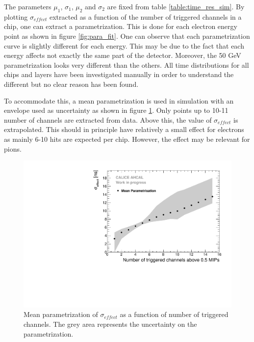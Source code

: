 The parameters $\mu_1$, $\sigma_1$, $\mu_2$ and $\sigma_2$ are fixed from table \ref{table:time_res_sim}. By plotting $\sigma_{effect}$ extracted as a function of the number of triggered channels in a chip, one can extract a parametrization. This is done for each electron energy point as shown in figure \ref{fig:para_fit}. One can observe that each parametrization curve is slightly different for each energy. This may be due to the fact that each energy affects not exactly the same part of the detector. Moreover, the 50 GeV parametrization looks very different than the others. All time distributions for all chips and layers have been investigated manually in order to understand the different but no clear reason has been found.

To accommodate this, a mean parametrization is used in simulation with an envelope used as uncertainty as shown in figure \ref{fig:mean_para}. Only points up to 10-11 number of channels are extracted from data. Above this, the value of $\sigma_{effect}$ is extrapolated. This should in principle have relatively a small effect for electrons as mainly 6-10 hits are expected per chip. However, the effect may be relevant for pions.

\begin{figure}[htbp!]
	\centering
	\includegraphics[width=0.7\linewidth]{../Thesis_Plots/Timing/Electrons/Plots/MeanParametrisationWithSystErrors.pdf}
	\caption{Mean parametrization of $\sigma_{effect}$ as a function of number of triggered channels. The grey area represents the uncertainty on the parametrization.}
	\label{fig:mean_para}
\end{figure}
